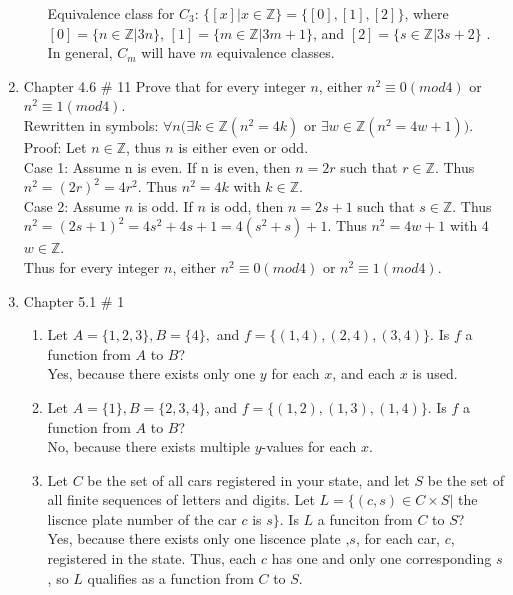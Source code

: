 \documentclass[10pt,a4paper]{article}
\begin{document}
\begin{enumerate}
\begin{enumerate}
Equivalence class for $C_3$: $\{[x]|x \in \mathbb{Z}\}=\{[0],[1],[2]\}$, where $[0]=\{n \in \mathbb{Z}|3n\}$, $[1]=\{m \in \mathbb{Z}|3m+1\}$, and $[2]=\{s \in \mathbb{Z}|3s+2\}$ .\\
In general, $C_m$ will have $m$ equivalence classes.
\end{enumerate}
\pagebreak
\item Chapter 4.6 \# 11 Prove that for every integer $n$, either $n^2 \equiv 0 (mod 4) $ or $n^2 \equiv 1 (mod 4)$.\\
Rewritten in symbols: $\forall n (\exists k \in \mathbb{Z}(n^2 = 4k)$ or $\exists w \in \mathbb{Z}(n^2  = 4w +1))$.\\
Proof: Let $n \in \mathbb{Z}$, thus $n$ is either even or odd.\\
Case 1: Assume n is even. If n is even, then $n=2r$ such that $r \in \mathbb{Z}$. Thus $n^2 = (2r)^2 = 4r^2$. Thus $n^2 =4k$ with $k \in \mathbb{Z}$.\\
Case 2: Assume $n$ is odd. If $n$ is odd, then $n=2s+1$ such that $s \in \mathbb{Z}$. Thus $n^2 = (2s+1)^2= 4s^2 +4s +1= 4(s^2+s)+1$. Thus $n^2 = 4w+1$ with 4$w \in \mathbb{Z}$.\\
Thus  for every integer $n$, either $n^2 \equiv 0 (mod 4) $ or $n^2 \equiv 1 (mod 4)$.\\
\item Chapter 5.1 \# 1 
\begin{enumerate}
\item Let $A = \{1,2,3\}, B= \{4\},$ and $f=\{(1,4),(2,4),(3,4)\}.$ Is $f$ a function from $A$ to $B$?\\
Yes, because there exists only one $y$ for each $x$, and each $x$ is used.\\
\item Let $A=\{1\}, B= \{2,3,4\}$, and $f= \{(1,2),(1,3),(1,4)\}$. Is $f$ a function from $A$ to $B$?\\
No, because there exists multiple $y$-values for each $x$.\\
\item Let $C$ be the set of all cars registered in your state, and let $S$ be the set of all finite sequences of letters and digits. Let $L=\{(c,s) \in C \times S |$ the liscnce plate number of the car $c$ is $s\}$. Is $L$ a funciton from $C$ to $S$?\\
Yes, because there exists only one liscence plate ,$s$, for each car, $c$, registered in the state. Thus, each $c$ has one and only one corresponding $s$, so $L$ qualifies as a function from $C$ to $S$.
\end{enumerate}

\end{enumerate}
\end{document}
